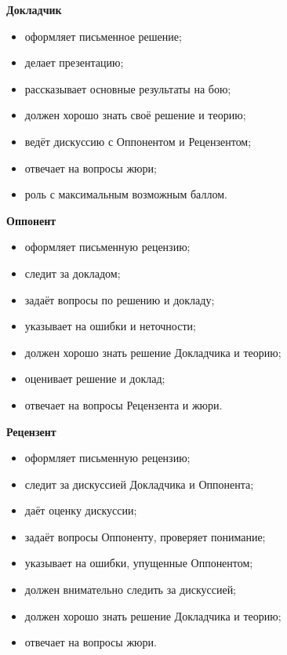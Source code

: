 \documentclass[aspectratio=1610,11pt]{beamer}
\newcommand\fram[2]{\begin{frame}{\bf #1} #2 \end{frame}}
\begin{document}
\fram{Докладчик}{
\large
\begin{itemize}
\item оформляет письменное решение;\vspace{2mm}
\item делает презентацию;\vspace{2mm}
\item рассказывает основные результаты на бою;\vspace{2mm}
\item должен хорошо знать своё решение и теорию;\vspace{2mm}
\item ведёт дискуссию с Оппонентом и Рецензентом;\vspace{2mm}
\item отвечает на вопросы жюри;\vspace{2mm}
\item роль с максимальным возможным баллом.
\end{itemize}
}

\fram{Оппонент}{
\large
\begin{itemize}
	\item оформляет письменную рецензию;\vspace{2mm}
	\item следит за докладом;\vspace{2mm}
	\item задаёт вопросы по решению и докладу;\vspace{2mm}
	\item указывает на ошибки и неточности;\vspace{2mm}
	\item должен хорошо знать решение Докладчика  и теорию;\vspace{2mm}
	\item оценивает решение и доклад;\vspace{2mm}
	\item отвечает на вопросы Рецензента и жюри.
\end{itemize}
}

\fram{Рецензент}{
\large
\begin{itemize}
	\item оформляет письменную рецензию;\vspace{2mm}
	\item следит за дискуссией Докладчика и Оппонента;\vspace{2mm}
	\item даёт оценку дискуссии;\vspace{2mm}
	\item задаёт вопросы Оппоненту, проверяет понимание;\vspace{2mm}
	\item указывает на ошибки, упущенные Оппонентом;\vspace{2mm}
	\item должен внимательно следить за дискуссией;\vspace{2mm}
	\item должен хорошо знать решение Докладчика  и теорию;\vspace{2mm}
	\item отвечает на вопросы жюри.
\end{itemize}
}
\end{document}
